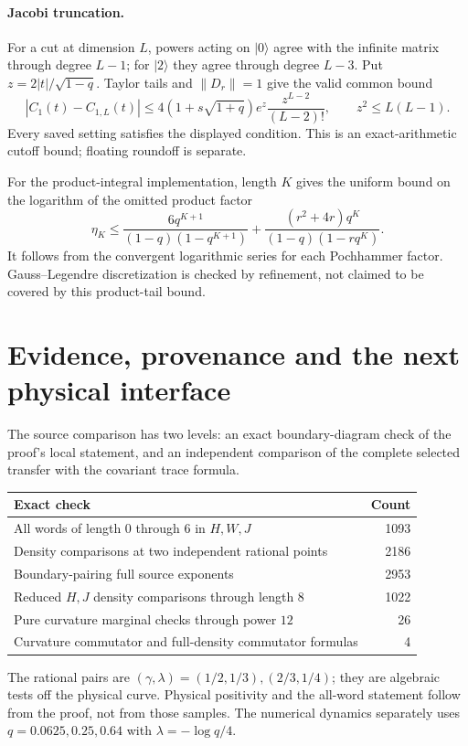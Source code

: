\documentclass[11pt]{article}
\newcommand{\norm}[1]{\left\lVert#1\right\rVert}
\begin{document}
\paragraph{Jacobi truncation.}
For a cut at dimension $L$, powers acting on $|0\rangle$ agree with
the infinite matrix through degree $L-1$; for $|2\rangle$ they agree
through degree $L-3$. Put $z=2|t|/\sqrt{1-q}$. Taylor tails and
$\norm{D_r}=1$ give the valid common bound
\begin{equation}
 |C_1(t)-C_{1,L}(t)|\le
 4(1+s\sqrt{1+q})e^z\frac{z^{L-2}}{(L-2)!},
 \qquad z^2\le L(L-1).
\end{equation}
Every saved setting satisfies the displayed condition. This is an
exact-arithmetic cutoff bound; floating roundoff is separate.

For the product-integral implementation, length $K$ gives the uniform
bound on the logarithm of the omitted product factor
\begin{equation}
 \eta_K\le\frac{6q^{K+1}}{(1-q)(1-q^{K+1})}
       +\frac{(r^2+4r)q^K}{(1-q)(1-rq^K)}.
\end{equation}
It follows from the convergent logarithmic series for each Pochhammer
factor. Gauss--Legendre discretization is checked by refinement,
not claimed to be covered by this product-tail bound.

\newpage
\section{Evidence, provenance and the next physical interface}
The source comparison has two levels: an exact boundary-diagram check
of the proof's local statement, and an independent comparison of the
complete selected transfer with the covariant trace formula.
\begin{center}
\begin{tabular}{lr}\toprule
Exact check&Count\\\midrule
All words of length $0$ through $6$ in $H,W,J$&1093\\
Density comparisons at two independent rational points&2186\\
Boundary-pairing full source exponents&2953\\
Reduced $H,J$ density comparisons through length $8$&1022\\
Pure curvature marginal checks through power $12$&26\\
Curvature commutator and full-density commutator formulas&4\\\bottomrule
\end{tabular}
\end{center}
The rational pairs are $(\gamma,\lambda)=(1/2,1/3),(2/3,1/4)$;
they are algebraic tests off the physical curve. Physical positivity
and the all-word statement follow from the proof, not from those
samples. The numerical dynamics separately uses
$q=0.0625,0.25,0.64$ with $\lambda=-\log q/4$.
\end{document}
